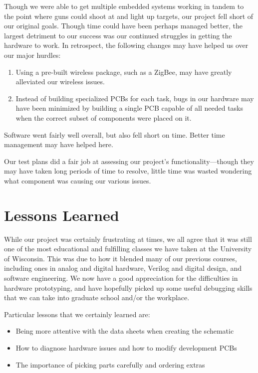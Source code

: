 \documentclass[oneside]{book}
\begin{document}
Though we were able to get multiple embedded systems working in tandem to the point where
guns could shoot at and light up targets, our project fell short of our original goals.
Though time could have been perhaps managed better,
the largest detriment to our success was our continued struggles in getting the hardware to work.
In retrospect, the following changes may have helped us over our major hurdles:
\begin{enumerate}
\item Using a pre-built wireless package, such as a ZigBee,
	may have greatly alleviated our wireless issues.
\item Instead of building specialized PCBs for each task,
	bugs in our hardware may have been minimized by building a single PCB capable
	of all needed tasks when the correct subset of components were placed on it.
\end{enumerate}
Software went fairly well overall, but also fell short on time.
Better time management may have helped here.

Our test plans did a fair job at assessing our project's functionality---though
they may have taken long periods of time to resolve,
little time was wasted wondering what component was causing our various issues.

\section{Lessons Learned}

While our project was certainly frustrating at times,
we all agree that it was still one of the most educational and fulfilling
classes we have taken at the University of Wisconsin.
This was due to how it blended many of our previous courses,
including ones in analog and digital hardware, Verilog and digital design,
and software engineering.
We now have a good appreciation for the difficulties in hardware prototyping,
and have hopefully picked up some useful debugging skills that we can take
into graduate school and/or the workplace.

Particular lessons that we certainly learned are:
\begin{itemize}
\item Being more attentive with the data sheets when creating the schematic
\item How to diagnose hardware issues and how to modify development PCBs
\item The importance of picking parts carefully and ordering extras
\end{itemize}
\end{document}
